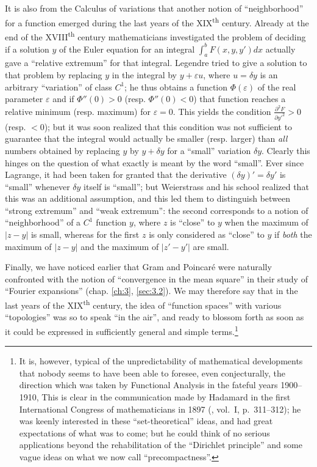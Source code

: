 \documentclass[12pt,a4paper,leqno,twoside]{extbook}
\newcommand{\supth}{\texorpdfstring{\textsuperscript{th}}{th}}
\newcommand{\pder}[2]{\frac{\partial #1}{\partial #2}}
\begin{document}
It is also from the Calculus of variations that another notion of ``neighborhood'' for a function emerged during the last years of the XIX\supth{} century. Already at the end of the XVIII\supth{} century mathematicians investigated the problem of deciding if a solution \(y\) of the Euler equation for an integral \(\int_a^b F(x,y,y')dx\) actually gave a ``relative extremum'' for that integral. Legendre tried to give a solution to that problem by replacing \(y\) in the integral by \(y + \varepsilon u\), where \(u = \delta y\) is an arbitrary ``variation'' of class \(C^1\); he thus obtains a function \(\Phi(\varepsilon)\) of the real parameter \(\varepsilon\) and if \(\Phi''(0) > 0\) (resp. \(\Phi''(0) < 0\)) that function reaches a relative minimum (resp. maximum) for \(\varepsilon = 0\). This yields the condition \(\pder{^2 F}{y'^2} > 0\) (resp. \(< 0\)); but it was soon realized that this condition was not sufficient to guarantee that the integral would actually be smaller (resp. larger) than \emph{all} numbers obtained by replacing \(y\) by \(y + \delta y\) for a ``small'' variation \(\delta y\). Clearly this hinges on the question of what exactly is meant by the word ``small''. Ever since Lagrange, it had been taken for granted that the derivative \((\delta y)' = \delta y'\) is ``small'' whenever \(\delta y\) itself is ``small''; but Weierstrass and his school realized that this was an additional assumption, and this led them to distinguish between ``strong extremum'' and ``weak extremum'': the second corresponds to a notion of ``neighborhood'' of a \(C^1\) function \(y\), where \(z\) is ``close'' to \(y\) when the maximum of \(|z-y|\) is small, whereas for the first \(z\) is only considered as ``close'' to \(y\) if \emph{both} the maximum of \(|z-y|\) and the maximum of \(|z' - y'|\) are small.

Finally, we have noticed earlier that Gram and Poincaré were naturally confronted with the notion of ``convergence in the mean square'' in their study of ``Fourier expansions'' (chap. \ref{ch:3}, \ref{sec:3.2}). We may therefore say that in the last years of the XIX\supth{} century, the idea of ``function spaces'' with various ``topologies'' was so to speak ``in the air'', and ready to blossom forth as soon as it could be expressed in sufficiently general and simple terms.\footnote{It is, however, typical of the unpredictability of mathematical developments that nobody seems to have been able to foresee, even conjecturally, the direction which was taken by Functional Analysis in the fateful years 1900--1910, This is clear in the communication made by Hadamard in the first International Congress of mathematicians in 1897 (\cite{094}, vol.~I, p.~311--312); he was keenly interested in these ``set-theoretical'' ideas, and had great expectations of what was to come; but he could think of no serious applications beyond the rehabilitation of the ``Dirichlet principle'' and some vague ideas on what we now call ``precompactness''.}
\end{document}
